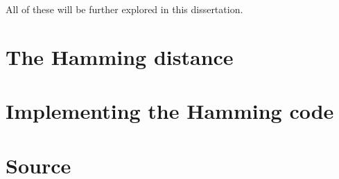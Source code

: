 \documentclass{article}
\begin{document}
    All of these will be further explored in this dissertation.

    \section{The Hamming distance}

    

    \section{Implementing the Hamming code}

    \section{Source}

\nocite{CodeIntro}
\nocite{Hamming}
\nocite{HammingBarcodes}
\nocite{Shannon}
{}

\end{document}
